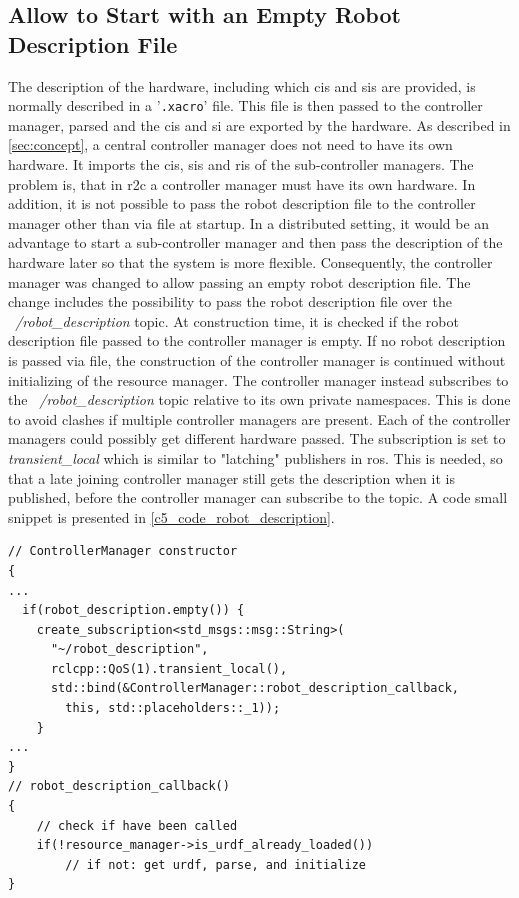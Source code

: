 \subsection{Allow to Start with an Empty Robot Description File}
The description of the hardware, including which \glspl{ci} and \glspl{si} are provided, is normally described in a '\texttt{.xacro}' file. This file is then passed to the controller manager, parsed and the \glspl{ci} and \gls{si} are exported by the hardware. 
As described in \autoref{sec:concept}, a central controller manager does not need to have its own hardware. It imports the \glspl{ci}, \glspl{si} and \glspl{ri} of the sub-controller managers. The problem is, that in \gls{r2c} a controller manager must have its own hardware. In addition, it is not possible to pass the robot description file to the controller manager other than via file at startup. In a distributed setting, it would be an advantage to start a sub-controller manager and then pass the description of the hardware later so that the system is more flexible. \newline
Consequently, the controller manager was changed to allow passing an empty robot description file. The change includes the possibility to pass the robot description file over the \textit{~/robot\_description} topic. At construction time, it is checked if the robot description file passed to the controller manager is empty. If no robot description is passed via file, the construction of the controller manager is continued without initializing of the resource manager. The controller manager instead subscribes to the \textit{~/robot\_description} topic relative to its own private namespaces. This is done to avoid clashes if multiple controller managers are present. Each of the controller managers could possibly get different hardware passed. The subscription is set to \textit{transient\_local} which is similar to "latching" publishers in \gls{ros}. This is needed, so that a late joining controller manager still gets the description when it is published, before the controller manager can subscribe to the topic. A code small snippet is presented in \autoref{c5_code_robot_description}.
\lstset{language=C++,basicstyle=\small}
\begin{lstlisting}[caption=Small code snippet for usage of the robot\_description topic.,label=c5_code_robot_description]
// ControllerManager constructor
{   
...
  if(robot_description.empty()) {
    create_subscription<std_msgs::msg::String>(
      "~/robot_description",
      rclcpp::QoS(1).transient_local(),
      std::bind(&ControllerManager::robot_description_callback,
        this, std::placeholders::_1));
    } 
...
}
// robot_description_callback()
{
    // check if have been called
    if(!resource_manager->is_urdf_already_loaded()) 
        // if not: get urdf, parse, and initialize
}
\end{lstlisting}

